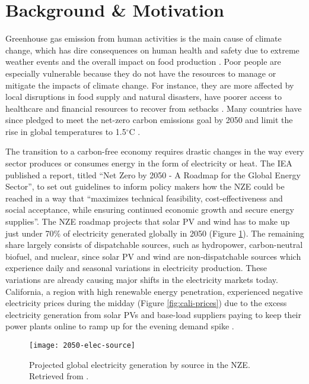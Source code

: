 \section{Background \& Motivation}

Greenhouse gas emission from human activities is the main cause of climate
change, which has dire consequences on human health and safety due to extreme
weather events and the overall impact on food production
\cite{mcmichael_global_2004}. Poor people are especially vulnerable because
they do not have the resources to manage or mitigate the impacts of climate
change. For instance, they are more affected by local disruptions in food
supply and natural disasters, have poorer access to healthcare and financial
resources to recover from setbacks \cite{hallegatte_shock_2016}. Many countries
have since pledged to meet the net-zero carbon emissions goal by 2050 and limit
the rise in global temperatures to 1.5$^{\circ}$C \cite{iea_net_2021}.

The transition to a carbon-free economy requires drastic changes in the way
every sector produces or consumes energy in the form of electricity or heat.
The \gls{IEA} published a report, titled ``Net Zero by 2050 - A Roadmap for the
Global Energy Sector'', to set out guidelines to inform policy makers how the
\gls{NZE} could be reached in a way that ``maximizes technical feasibility,
cost-effectiveness and social acceptance, while ensuring continued economic
growth and secure energy supplies''. The \gls{NZE} roadmap projects that
solar \gls{PV} and wind has to make up just under 70\% of
electricity generated globally in 2050 (Figure \ref{fig:2050-elec-source}).
The remaining share largely consists of dispatchable sources, such as
hydropower, carbon-neutral biofuel, and nuclear, since solar \gls{PV} and wind
are non-dispatchable sources which experience daily and seasonal variations in
electricity production. These variations are already causing major shifts in
the electricity markets today. California, a region with high renewable energy
penetration, experienced negative electricity prices during the midday (Figure
\ref{fig:cali-prices}) due to the excess electricity generation from solar
\glspl{PV} and base-load suppliers paying to keep their power plants online to
ramp up for the evening demand spike \cite{forsberg_market_2020}.

\begin{figure}[htb!]
	\centering
	\texttt{[image: 2050-elec-source]}
	\caption{Projected global electricity generation by source in the
	\gls{NZE}. Retrieved from \cite{iea_net_2021}.}
	\label{fig:2050-elec-source}
\end{figure}

